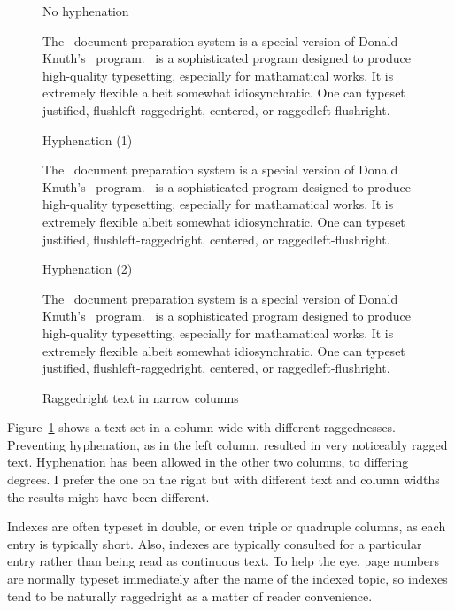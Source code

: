 \documentclass[10pt,a4paper,extrafontsizes]{memoir}
\begin{document}


\newlength{\rag}
  \setlength{\rag}{0.25\textwidth} %
  \addtolength{\rag}{10pt} 
  \addtolength{\rag}{9pt}  
\setlength{\rag}{107pt}
\newcommand{\ragtext}{%
The \ltx\ document preparation system is a special version of
Donald Knuth's \tx\ program. \tx\ is a sophisticated program
designed to produce high-quality typesetting, especially for
mathamatical works. It is extremely flexible albeit somewhat 
idiosynchratic. One can typeset justified, flushleft-raggedright,
centered, or raggedleft-flushright.}


\begin{figure}
\centering
\begin{minipage}[t]{\rag}
\raggedright
\noindent No hyphenation
\vspace{\onelineskip}

\parindent=15pt\indent \ragtext
\end{minipage}
\hfill
\begin{minipage}[t]{\rag}
\raggedyright
\noindent Hyphenation (1)
\vspace{\onelineskip}

\indent \ragtext
\end{minipage}
\hfill
\begin{minipage}[t]{\rag}
\raggedyright[1em]
\noindent Hyphenation (2)
\vspace{\onelineskip}

\indent \ragtext
\end{minipage}
\caption{Raggedright text in narrow columns} \label{fig:raggedright}
\end{figure}

\begin{paracol}{2}
\switchEng
    Figure~\ref{fig:raggedright} shows a text set in a column
\the\rag{} wide with 
different raggednesses. Preventing hyphenation, as in the left column, 
resulted in very noticeably ragged text. Hyphenation has been allowed
in the other two columns, to differing degrees. I prefer
the one on the right but with different text and column widths the results
might have been different.

    Indexes are often typeset in double, 
or even triple or quadruple columns,
as each entry is typically short. Also, indexes are typically 
consulted
for a particular entry rather than being read as continuous text. To help
the eye, page numbers are normally typeset immediately after the 
name of the indexed topic, so indexes tend to be 
naturally raggedright as a matter of reader 
convenience.
\end{paracol}
\end{document}
